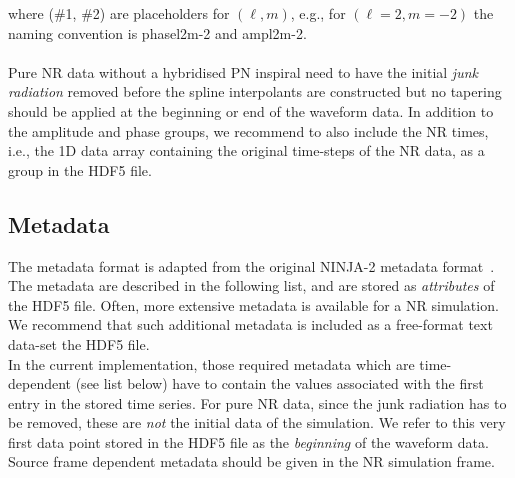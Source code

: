 \documentclass[11pt,tightenlines,article,amssymb,amsmath,amsfonts,superscriptaddress]{revtex4}
\begin{document}
where (\#1, \#2) are placeholders for $(\ell, m)$, e.g., for $(\ell=2, m=-2)$ the naming convention is phase\textunderscore l2\textunderscore m-2 and 
amp\textunderscore l2\textunderscore m-2. \\
\\Pure NR data without a hybridised PN inspiral need to have the initial \emph{junk radiation} removed before the spline interpolants are constructed but no tapering should be applied at the beginning or end of the waveform data.  
In addition to the amplitude and phase groups, we recommend to also include the NR times, i.e., the 1D data array containing the original time-steps of the NR data, as a group in the HDF5 file. 

\subsection{Metadata}
\label{sec:meta}
The metadata format is adapted from the original NINJA-2 metadata format~\cite{Brown:2007jx}. The metadata are described in the following list, and are 
stored as \emph{attributes} of the HDF5 file. Often, more extensive metadata is available for a NR simulation. We recommend that such additional metadata is included as a free-format text data-set the HDF5 file. \\

In the current implementation, those required metadata which are time-dependent (see list below) have to contain the values associated with the first entry in the stored time series. For pure NR data, since the junk radiation has to be removed, these are \emph{not} the initial data of the simulation. We refer to this very first data point stored in the HDF5 file as the \emph{beginning} of the waveform data. Source frame dependent metadata should be given in the NR simulation frame. \\
\end{document}
